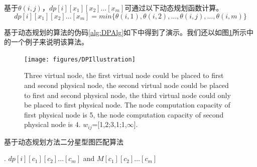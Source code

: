 基于$\theta (i,j)$，$dp[i][{x_1}][{x_2}] \ldots [{x_m}]$可通过以下动态规划函数计算。
\begin{equation}
dp[i][{x_1}][{x_2}] \ldots [{x_m}] = min\{\theta (i,1),\theta (i,2),\ldots,\theta (i,j),\ldots,\theta (i,m)\}
\label{eq:update function}
\end{equation}

基于动态规划的算法的伪码\ref{alg:DPAlg}如下中得到了演示。我们还以如图\ref{fig:DPIllustration}所示中的一个例子来说明该算法。


\begin{figure}
\centering
\texttt{[image: figures/DPIllustration]}\\
  \caption{Three virtual node, the first virtual node could be placed to first and second physical node,  the second virtual node could be placed to first and second physical node,  the third virtual node could only be placed to first physical node.  The  node computation capacity of first physical node is 5, the node computation capacity of second physical node is 4. $w_{ij}$=[1,2;3,1;1,$\infty$].}\label{fig:DPIllustration}
\end{figure}


\begin{algorithm}
\label{alg:DPAlg}
\caption{基于动态规划方法二分星型图匹配算法}
\begin{algorithmic}[1]


.
\ENDFOR
\ENDFOR
\RETURN $dp[i][{c_1}][{c_2}] \ldots [{c_m}]$ and $M[{c_1}][{c_2}] \ldots [{c_m}]$
\end{algorithmic}
\end{algorithm}

